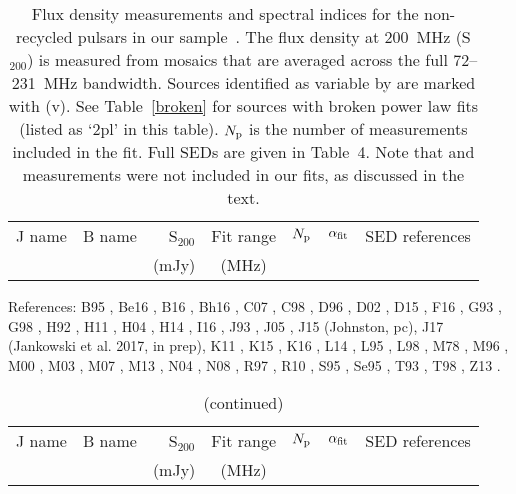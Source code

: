 \documentclass{pasa}%
\begin{document}
\begin{table*}
  \centering
  \caption{Flux density measurements and spectral indices for the non-recycled pulsars in our sample\
. The flux density at 200~MHz (S$_{200}$) is measured from mosaics that are averaged across the full 72--231~MHz bandwidth.  Sources
identified as variable by \citet{bell16} are marked with (v). See Table~\ref{broken} for sources with
broken power law fits (listed as `2pl' in this table). $N_{\rm p}$ is the number of measurements included in the fit. Full SEDs are given in Table~4. Note that \citet{stovall15} and \citet{frail16} measurements were not included in our fits, as discussed in the text.}
  \label{sinormal}
  \begin{tabular}{llrccrr}                 
    \hline
    J name & B name & S$_{200}$ & Fit range & $N_{\rm p}$ & $\alpha_{\rm fit}$ & SED references \\
           &        & (mJy)       & (MHz)       & &     &   \\
    \hline

    \hline
  \end{tabular}
References:
B95 \citep{becker95}, Be16 \citep{bell16}, B16 \citep{bilous16},
Bh16 \citep{bhattacharyya16},
C07 \citep{cohen07}, C98 \citep{condon98}, D96 \citep{douglas96},
D02 \citep{debreuck02}, D15 \citep{dai15}, F16 \citep{frail16},
G93 \citep{griffith93}, G98 \citep{gould98}, H92 \citep{helfand92},
H11 \citep{hessels11}, H04 \citep{hobbs04}, H14 \citep{hurleywalker14}, I16 \citep{intema16}, J93 \citep{johnston93}, J05 \citep{johnston05}, J15 (Johnston, pc), J17 (Jankowski et al. 2017, in prep), K11 \citep{keith11}, K15 \citep{kuniyoshi15}, K16 \citep{kondratiev16}, L14 \citep{lane14},
L95 \citep{lorimer95}, L98 \citep{lyne98}, M78 \citep{manchester78}, M96 \citep{mcconnell96}, M00 \citep{malofeev00}, M03 \citep{mauch03}, M07 \citep{murphy07}, M13 \citep{manchester13},
N04 \citep{nord04}, N08 \citep{noutsos08}, R97 \citep{ramachandran97},
R10 \citep{renaud10}, S95 \citep{slee95}, Se95 \citep{seiradakis95}, T93 \citep{taylor93},
T98 \citep{toscano98}, Z13 \citep{zakharenko13}.
\end{table*}

\begin{table*}\ContinuedFloat
  \centering
  \caption{(continued)}
    \begin{tabular}{llrccrr} %
    \hline
    J name & B name & S$_{200}$ & Fit range & $N_{\rm p}$ & $\alpha_{\rm fit}$ & SED references \\
           &        & (mJy)       & (MHz)       & &     &   \\
    \hline

    \hline
  \end{tabular}
\end{table*}
\end{document}
